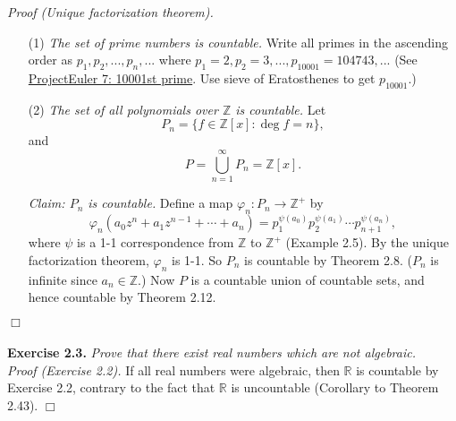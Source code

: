 \documentclass{article}
\begin{document}
\emph{Proof (Unique factorization theorem).}
\begin{enumerate}
\item[(1)]
\emph{The set of prime numbers is countable.}
Write all primes in the ascending order as $p_1, p_2, ..., p_n, ...$
where $p_1 = 2, p_2 = 3, ..., p_{10001} = 104743, ...$
(See \href{https://projecteuler.net/problem=7}{ProjectEuler 7: 10001st prime}.
Use sieve of Eratosthenes to get $p_{10001}$.)
\item[(2)]
\emph{The set of all polynomials over $\mathbb{Z}$ is countable.}
Let
$$P_n = \{ f \in \mathbb{Z}[x] : \deg f = n \},$$
and
$$P = \bigcup_{n = 1}^{\infty} P_n = \mathbb{Z}[x].$$

\emph{Claim: $P_n$ is countable.}
Define a map $\varphi_n: P_n \rightarrow \mathbb{Z}^+$ by
$$\varphi_n(a_0 z^n + a_1 z^{n-1} + \cdots + a_n)
= p_1^{\psi(a_0)} p_2^{\psi(a_1)} \cdots p_{n+1}^{\psi(a_n)},$$
where $\psi$ is a 1-1 correspondence from $\mathbb{Z}$ to $\mathbb{Z}^+$ (Example 2.5).
By the unique factorization theorem, $\varphi_n$ is 1-1.
So $P_n$ is countable by Theorem 2.8.
($P_n$ is infinite since $a_n \in \mathbb{Z}$.)
Now $P$ is a countable union of countable sets,
and hence countable by Theorem 2.12.
\end{enumerate}
$\Box$ \\\\






\textbf{Exercise 2.3.}
\emph{Prove that there exist real numbers which are not algebraic.} \\

\emph{Proof (Exercise 2.2).}
If all real numbers were algebraic, then $\mathbb{R}$ is countable by Exercise 2.2,
contrary to the fact that
$\mathbb{R}$ is uncountable (Corollary to Theorem 2.43).
$\Box$ \\
\end{document}
